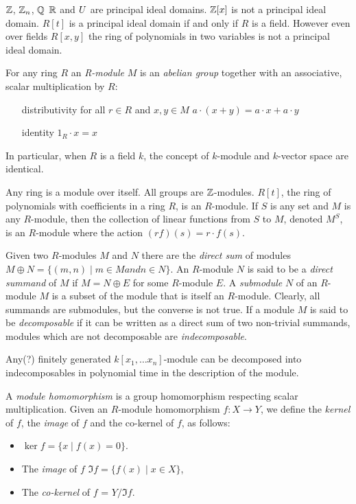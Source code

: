 \begin{example}
$\mathbb{Z}$, $\mathbb{Z}_n$, $\mathbb{Q}$ $\mathbb{R}$ and $U$ are principal ideal domains. $\mathbb{Z}[x]$ is not a principal ideal domain. $R[t]$ is a principal ideal domain if and only if $R$ is a field. However
even over fields $R[x,y]$ the ring of polynomials in two variables is not a principal ideal domain.
\end{example}
For any ring $R$ an \emph{R-module} $M$ is an \emph{abelian group} together with an associative, scalar multiplication by $R$: 
\begin{itemize}
\item[distributivity] for all $r \in R$ and $x,y \in M$ $a \cdot (x + y)  = a \cdot x + a \cdot y$
\item[identity] $1_R \cdot x = x$
\end{itemize}
In particular, when $R$ is a field $k$, the concept of $k$-module and $k$-vector space are identical.
\begin{example}
Any ring is a module over itself.  All groups are $\mathbb{Z}$-modules. $R[t]$, the ring of polynomials with coefficients in a ring $R$, is an $R$-module. If $S$ is any set and $M$ is any $R$-module, then the collection of linear functions from $S$ to $M$, denoted $M^S$, is an $R$-module where the action $(rf)(s) =  r \cdot f(s)$.
\end{example}
Given two $R$-modules $M$ and $N$ there are the \emph{direct sum} of modules $M \oplus N = \{ (m,n) \mid m \in M and n \in N \}$.
An $R$-module $N$ is said to be a \emph{direct summand} of $M$ if $M = N \oplus E$ for some $R$-module $E$. 
A \emph{submodule} $N$ of an $R$-module $M$ is a subset of the module that is itself an $R$-module. Clearly, all summands are submodules, but the converse is not true.
If a module $M$ is said to be \emph{decomposable} if it can be written as a direct sum of two non-trivial summands, modules which are not decomposable are \emph{indecomposable}. 
\begin{theorem}
Any(?) finitely generated $k[x_1, \ldots x_n]$-module can be decomposed into indecomposables in polynomial time in the description of the module. 
\end{theorem}
A \emph{module homomorphism} is a group homomorphism respecting scalar multiplication. Given an $R$-module homomorphism $f: X \rightarrow Y $, we define the \emph{kernel} of $f$, the \emph{image} of $f$ and the co-kernel of $f$, as follows: 
\begin{itemize}
\item $\ker{f} = \{ x \mid f(x) = 0 \}$. 
\item The \emph{image} of $f$ $\Im{f} = \{ f(x) \mid x \in X\}$, 
\item The \emph{co-kernel} of $f$ = $Y/\Im{f}$.
\end{itemize}
